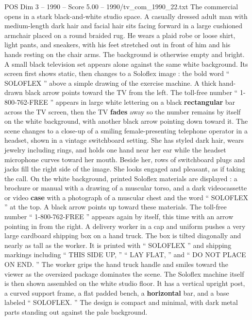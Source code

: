 \begin{textsample}{POS Dim 3 – 1990 – Score 5.00 – 1990/tv\_com\_1990\_22.txt}  \label{ex:f3_pos_060}
The commercial opens in a stark black-and-white studio space.
A casually dressed adult man with medium-length dark hair and facial hair sits facing forward in a large cushioned armchair placed on a round braided rug.
He wears a plaid robe or loose shirt, light pants, and sneakers, with his feet stretched out in front of him and his hands resting on the chair arms.
The background is otherwise empty and bright.
A small black television set appears alone against the same white background.
Its screen first shows static, then changes to a Soloflex image : the bold word “ SOLOFLEX ” above a simple drawing of the exercise machine.
A thick hand-drawn black arrow points toward the TV from the left.
The toll-free number “ 1-800-762-FREE ” appears in large white lettering on a black \textbf{rectangular} bar across the TV screen, then the TV \textbf{fades} away so the number remains by itself on the white background, with another black arrow pointing down toward it.
The scene changes to a close-up of a smiling female-presenting telephone operator in a headset, shown in a vintage switchboard setting.
She has styled dark hair, wears jewelry including rings, and holds one hand near her ear while the headset microphone curves toward her mouth.
Beside her, rows of switchboard plugs and jacks fill the right side of the image.
She looks engaged and pleasant, as if taking the call.
On the white background, printed Soloflex materials are displayed : a brochure or manual with a drawing of a muscular torso, and a dark videocassette or video \textbf{case} with a photograph of a muscular chest and the word “ SOLOFLEX ” at the top.
A black arrow points up toward these materials.
The toll-free number “ 1-800-762-FREE ” appears again by itself, this time with an arrow pointing in from the right.
A delivery worker in a cap and uniform pushes a very large cardboard shipping box on a hand truck.
The box is tilted diagonally and nearly as tall as the worker.
It is printed with “ SOLOFLEX ” and shipping markings including “ THIS SIDE UP, ” “ LAY FLAT, ” and “ DO NOT PLACE ON END. ” The worker grips the hand truck handle and smiles toward the viewer as the oversized package dominates the scene.
The Soloflex machine itself is then shown assembled on the white studio floor.
It has a vertical upright post, a curved support frame, a flat padded bench, a \textbf{horizontal} bar, and a base labeled “ SOLOFLEX. ” The design is compact and minimal, with dark metal parts standing out against the pale background.

\end{textsample}
